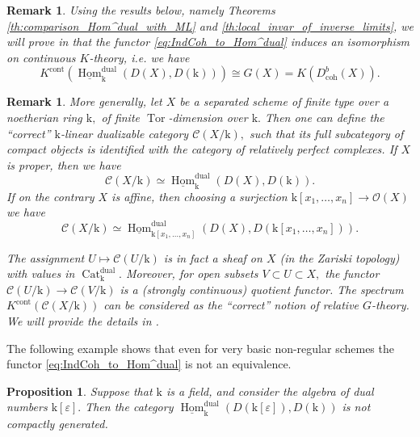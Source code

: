 \documentclass[11pt,leqno]{amsart}
\newtheorem{prop}[theo]{Proposition}
\newtheorem{remark}[theo]{Remark}
\numberwithin{equation}{section}
\def\coh{\operatorname{coh}}
\def\Hom{\operatorname{Hom}}
\newcommand{\Cat}{\operatorname{Cat}}
\newcommand{\cont}{\operatorname{cont}}
\newcommand{\dual}{\operatorname{dual}}
\newcommand{\mk}{\mathrm k}
\newcommand{\cO}{{\mathcal O}}
\newcommand{\cC}{{\mathcal C}}
\newcommand{\veps}{\varepsilon}
\newcommand{\un}{\underline}
\newcommand{\Tor}{\operatorname{Tor}}
\begin{document}
\begin{remark}
Using the results below, namely Theorems \ref{th:comparison_Hom^dual_with_ML} and \ref{th:local_invar_of_inverse_limits}, we will prove in \cite{E} that the functor \eqref{eq:IndCoh_to_Hom^dual} induces an isomorphism on continuous $K$-theory, i.e. we have
\begin{equation*}
K^{\cont}(\un{\Hom}_{\mk}^{\dual}(D(X),D(\mk)))\cong G(X) = K(D^b_{\coh}(X)).
\end{equation*}
\end{remark}

\begin{remark}
More generally, let $X$ be a separated scheme of finite type over a noetherian ring $\mk,$ of finite $\Tor$-dimension over $\mk.$ Then one can define the ``correct'' $\mk$-linear dualizable category $\cC(X/\mk),$ such that its full subcategory of compact objects is identified with the category of relatively perfect complexes. If $X$ is proper, then we have $$\cC(X/\mk)\simeq\un{\Hom}_{\mk}^{\dual}(D(X),D(\mk)).$$ If on the contrary $X$ is affine, then choosing a surjection $\mk[x_1,\dots,x_n]\to \cO(X)$ we have $$\cC(X/\mk)\simeq\un{\Hom}_{\mk[x_1,\dots,x_n]}^{\dual}(D(X),D(\mk[x_1,\dots,x_n])).$$

The assignment $U\mapsto \cC(U/\mk)$ is in fact a sheaf on $X$ (in the Zariski topology) with values in $\Cat_{\mk}^{\dual}.$ Moreover, for open subsets $V\subset U\subset X,$ the functor $\cC(U/\mk)\to \cC(V/\mk)$ is a (strongly continuous) quotient functor. The spectrum $K^{\cont}(\cC(X/\mk))$ can be considered as the ``correct'' notion of relative $G$-theory. We will provide the details in \cite{E}.
\end{remark}

The following example shows that even for very basic non-regular schemes the functor \eqref{eq:IndCoh_to_Hom^dual} is not an equivalence.

\begin{prop}
Suppose that $\mk$ is a field, and consider the algebra of dual numbers $\mk[\veps].$ Then the category $\un{\Hom}_{\mk}^{\dual}(D(\mk[\veps]),D(\mk))$ is not compactly generated.
\end{prop}
\end{document}
